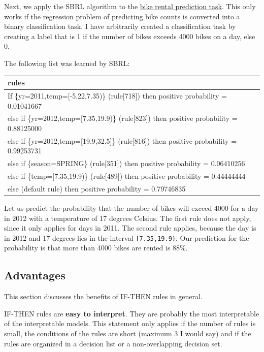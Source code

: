 \documentclass[
  12pt,
]{krantz}
\begin{document}
Next, we apply the SBRL algorithm to the \protect\hyperlink{bike-data}{bike rental prediction task}.
This only works if the regression problem of predicting bike counts is converted into a binary classification task.
I have arbitrarily created a classification task by creating a label that is 1 if the number of bikes exceeds 4000 bikes on a day, else 0.

The following list was learned by SBRL:

\begin{tabular}{>{\raggedright\arraybackslash}p{10cm}}
\hline
rules\\
\hline
If      \{yr=2011,temp=[-5.22,7.35)\} (rule[718]) then positive probability = 0.01041667\\
\hline
else if \{yr=2012,temp=[7.35,19.9)\} (rule[823]) then positive probability = 0.88125000\\
\hline
else if \{yr=2012,temp=[19.9,32.5]\} (rule[816]) then positive probability = 0.99253731\\
\hline
else if \{season=SPRING\} (rule[351]) then positive probability = 0.06410256\\
\hline
else if \{temp=[7.35,19.9)\} (rule[489]) then positive probability = 0.44444444\\
\hline
else  (default rule)  then positive probability = 0.79746835\\
\hline
\end{tabular}

Let us predict the probability that the number of bikes will exceed 4000 for a day in 2012 with a temperature of 17 degrees Celsius.
The first rule does not apply, since it only applies for days in 2011.
The second rule applies, because the day is in 2012 and 17 degrees lies in the interval \texttt{{[}7.35,19.9)}.
Our prediction for the probability is that more than 4000 bikes are rented is 88\%.

\hypertarget{advantages-3}{%
\subsection{Advantages}\label{advantages-3}}

This section discusses the benefits of IF-THEN rules in general.

IF-THEN rules are \textbf{easy to interpret}.
They are probably the most interpretable of the interpretable models.
This statement only applies if the number of rules is small, the conditions of the rules are short (maximum 3 I would say) and if the rules are organized in a decision list or a non-overlapping decision set.
\end{document}
